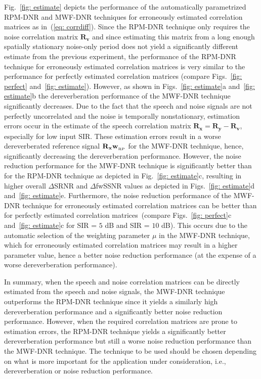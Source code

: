 \documentclass[10pt]{IEEEtran}
\begin{document}
Fig.~\ref{fig: estimate} depicts the performance of the automatically parametrized RPM-DNR and MWF-DNR techniques for erroneously estimated correlation matrices as in~(\ref{eq: corrdiff}).
{{Since the RPM-DNR technique only requires the noise correlation matrix $\mathbf{R}_{\mathbf{v}}$ and since estimating this matrix from a long enough spatially stationary noise-only period does not yield a significantly different estimate from the previous experiment, the performance of the RPM-DNR technique for erroneously estimated correlation matrices is very similar to the performance for perfectly estimated correlation matrices (compare Figs.~\ref{fig: perfect} and~\ref{fig: estimate}).}}
However, as shown in Figs.~\ref{fig: estimate}a and~\ref{fig: estimate}b the dereverberation performance of the MWF-DNR technique significantly decreases.
Due to the fact that the speech and noise signals are not perfectly uncorrelated and the noise is temporally nonstationary, estimation errors occur in the estimate of the speech correlation matrix $\mathbf{R}_{\mathbf{x}} = \mathbf{R}_{\mathbf{y}} - \mathbf{R}_{\mathbf{v}}$, especially for low input SIR.
These estimation errors result in a worse dereverberated reference signal $\mathbf{R}_{\mathbf{x}}\mathbf{w}_{_{\rm RP}}$ for the MWF-DNR technique, hence, significantly decreasing the dereverberation performance. 
However, the noise reduction performance for the MWF-DNR technique is significantly better than for the RPM-DNR technique as depicted in Fig.~\ref{fig: estimate}c, resulting in higher overall $\Delta$SRNR and $\Delta$fwSSNR values as depicted in Figs.~\ref{fig: estimate}d and~\ref{fig: estimate}e.
Furthermore, the noise reduction performance of the MWF-DNR technique for erroneously estimated correlation matrices can be better than for perfectly estimated correlation matrices~(compare Figs.~\ref{fig: perfect}c and~\ref{fig: estimate}c for SIR = $5$ dB and SIR = $10$ dB).
This occurs due to the automatic selection of the weighting parameter $\mu$ in the MWF-DNR technique, which for erroneously estimated correlation matrices may result in a higher parameter value, hence a better noise reduction performance (at the expense of a worse dereverberation performance).

{{In summary, when the speech and noise correlation matrices can be directly estimated from the speech and noise signals, the MWF-DNR technique outperforms the RPM-DNR technique since it yields a similarly high dereverberation performance and a significantly better noise reduction performance. 
However, when the required correlation matrices are prone to estimation errors, the RPM-DNR technique yields a significantly better dereverberation performance but still a worse noise reduction performance than the MWF-DNR technique.}} 
The technique to be used should be chosen depending on what is more important for the application under consideration, i.e., dereverberation or noise reduction performance. 
\end{document}
